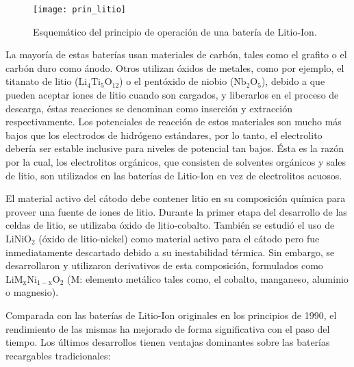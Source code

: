 \begin{figure}[h!]
    \begin{center}
	\texttt{[image: prin\_litio]}
	\caption{Esquem\'atico del principio de operaci\'on de una bater\'ia de
	Litio-Ion.}
	\label{op_lithium-ion}
    \end{center}
\end{figure}

\noindent La mayoría de estas baterías usan materiales de carbón, tales como el
grafito o el carbón duro como ánodo. Otros utilizan óxidos de metales, como por
ejemplo, el titanato de litio ($\mathrm{Li_4Ti_5O_{12}}$) o el pentóxido de
niobio ($\mathrm{Nb_2O_5}$), debido a que pueden aceptar iones de litio cuando
son cargados, y liberarlos en el proceso de descarga, \'estas reacciones se
denominan como inserción y extracción respectivamente. Los potenciales de
reacción de estos materiales son mucho más bajos que los electrodos de hidrógeno
estándares, por lo tanto, el electrolito debería ser estable inclusive para
niveles de potencial tan bajos. Ésta es la razón por la cual, los electrolitos
orgánicos, que consisten de solventes orgánicos y sales de litio, son utilizados
en las baterías de Litio-Ion en vez de electrolitos acuosos.

\noindent El material activo del cátodo debe contener litio en su composición
química para proveer una fuente de iones de litio. Durante la primer etapa del
desarrollo de las celdas de litio, se utilizaba \'oxido de litio-cobalto.
También se estudió el uso de $\mathrm{LiNiO_2}$ (\'oxido de litio-nickel) como 
material activo para el cátodo pero fue inmediatamente descartado debido a su 
inestabilidad térmica. Sin embargo, se desarrollaron y utilizaron derivativos de 
esta composición, formulados como $\mathrm{LiM_xNi_{1-x}O_2}$  
(M: elemento metálico tales como, el cobalto, manganeso, aluminio o magnesio).

\noindent Comparada con las baterías de Litio-Ion originales en los principios 
de 1990, el rendimiento de las mismas ha mejorado de forma significativa con 
el paso del tiempo. Los últimos desarrollos tienen ventajas dominantes sobre 
las baterías recargables tradicionales:

